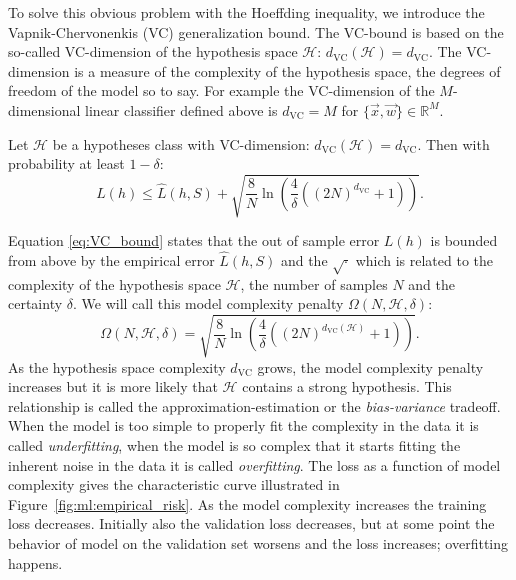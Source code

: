 To solve this obvious problem with the Hoeffding inequality, we introduce the Vapnik-Chervonenkis (VC) generalization bound. The VC-bound is based on the so-called VC-dimension of the hypothesis space $\mathcal{H}$: $d_\mathrm{VC}(\mathcal{H}) = d_\mathrm{VC}$. The VC-dimension is a measure of the complexity of the hypothesis space, the degrees of freedom of the model so to say. For example the VC-dimension of the $M$-dimensional linear classifier defined above is $d_\mathrm{VC}=M$ for $\{\vec{x}, \vec{w}\} \in \mathbb{R}^M$. 
\begin{theorem}
  \label{theorem:VC_generalization_bound}
  Let $\mathcal{H}$ be a hypotheses class with VC-dimension: $d_\mathrm{VC}(\mathcal{H}) = d_\mathrm{VC}$. Then with probability at least $1-\delta$: 
  \begin{equation}
    \label{eq:VC_bound}
    L(h) \leq \hat{L}(h, S) + \sqrt{ \frac{8}{N} \ln \left( \frac{4}{\delta} \left( \left(2N \right)^{d_\mathrm{VC}} + 1 \right)  \right)} .
  \end{equation}
\end{theorem}
Equation \eqref{eq:VC_bound} states that the out of sample error $L(h)$ is bounded from above by the empirical error $\hat{L}(h, S)$ and the $\sqrt{ \boldsymbol{\cdot}}$ which is related to the complexity of the hypothesis space $\mathcal{H}$, the number of samples $N$ and the certainty $\delta$. We will call this model complexity penalty $\Omega(N, \mathcal{H}, \delta)$:
\begin{equation}
  \Omega(N, \mathcal{H}, \delta) = \sqrt{ \frac{8}{N} \ln \left( \frac{4}{\delta} \left( \left(2N \right)^{d_\mathrm{VC}(\mathcal{H})} + 1 \right)  \right)}.
\end{equation}
As the hypothesis space complexity $d_\mathrm{VC}$ grows, the model complexity penalty increases but it is more likely that $\mathcal{H}$ contains a strong hypothesis. This relationship is called the approximation-estimation or the  \emph{bias-variance} tradeoff. When the model is too simple to properly fit the complexity in the data it is called \emph{underfitting}, when the model is so complex that it starts fitting the inherent noise in the data it is called \emph{overfitting}. The loss as a function of model complexity gives the characteristic curve illustrated in Figure~\ref{fig:ml:empirical_risk}. As the model complexity increases the training loss decreases. Initially also the validation loss decreases, but at some point the behavior of model on the validation set worsens and the loss increases; overfitting happens. 

